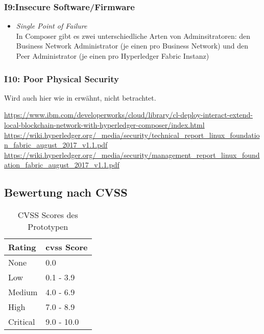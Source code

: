         \subsubsection*{I9:Insecure Software/Firmware}
            \begin{itemize}[leftmargin=0cm,label={}]
    	        \item \emph{Single Point of Failure}\label{vuln:prototype_spf}\\
                    In Composer gibt es zwei unterschiedliche Arten von Adminsitratoren: den Business Network Administrator (je einen pro Business Network) und den Peer Administrator (je einen pro Hyperledger Fabric Instanz)
            \end{itemize}
            
        \subsubsection*{I10: Poor Physical Security}
            Wird auch hier wie in  erwähnt, nicht betrachtet.
    
    \sloppy\url{https://www.ibm.com/developerworks/cloud/library/cl-deploy-interact-extend-local-blockchain-network-with-hyperledger-composer/index.html}\\
    \sloppy\url{https://wiki.hyperledger.org/_media/security/technical_report_linux_foundation_fabric_august_2017_v1.1.pdf}\\
    \sloppy\url{https://wiki.hyperledger.org/_media/security/management_report_linux_foundation_fabric_august_2017_v1.1.pdf}
    
    \subsection{Bewertung nach CVSS}
    	\begin{table}[H]
            \centering
            \begin{tabular}{|m{}|m{}|}
            \hline
            \textbf{Rating}   & \textbf{\gls{cvss} Score}   \\ \hline
            \rowcolor{light-gray}
            None              & 0.0                         \\ \hline
            Low               & 0.1 - 3.9                   \\ \hline
            \rowcolor{light-gray}
            Medium            & 4.0 - 6.9                   \\ \hline
            High              & 7.0 - 8.9                   \\ \hline
            \rowcolor{light-gray}
            Critical          & 9.0 - 10.0                  \\ \hline
            \end{tabular}
            \caption[CVSS Scores des Prototypen]{CVSS Scores des Prototypen}
            \label{tab:eval_cvss}
        \end{table}
